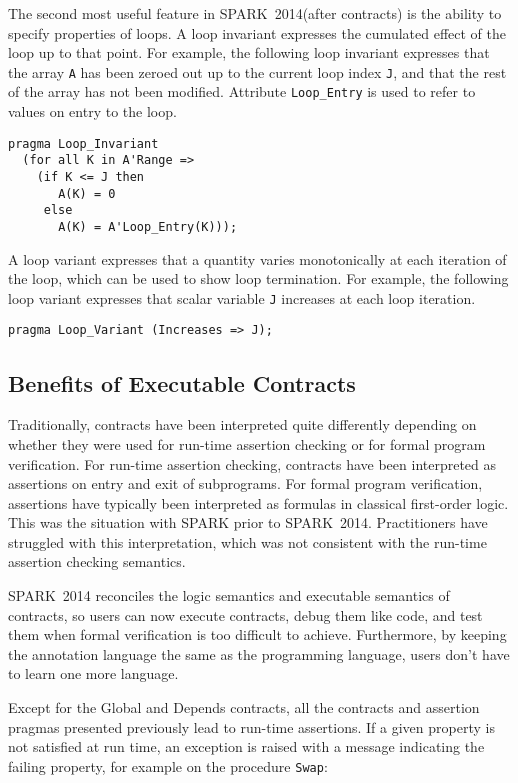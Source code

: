 \documentclass[10pt,a4paper,twocolumn]{article}
\newcommand{\newspark}{SPARK~2014\xspace}
\newcommand{\SPARK}[1]{\lstinline[language=Ada,basicstyle={\footnotesize
      \sffamily},framesep=0pt]$#1$}
\begin{document}
The second most useful feature in \newspark (after contracts) is the ability to
specify properties of loops. A loop invariant expresses the cumulated effect
of the loop up to that point. For example, the following loop invariant
expresses that the array \SPARK{A} has been zeroed out up to the current loop
index \SPARK{J}, and that the rest of the array has not been modified.
Attribute \SPARK{Loop_Entry} is used to refer to values on entry to the loop.

\begin{lstlisting}
pragma Loop_Invariant
  (for all K in A'Range =>
    (if K <= J then
       A(K) = 0
     else
       A(K) = A'Loop_Entry(K)));
\end{lstlisting}

A loop variant expresses that a quantity varies monotonically at each iteration
of the loop, which can be used to show loop termination. For example, the
following loop variant expresses that scalar variable \SPARK{J} increases at
each loop iteration.

\begin{lstlisting}
pragma Loop_Variant (Increases => J);
\end{lstlisting}

\subsection{Benefits of Executable Contracts}
\label{subsec:ExecutableContracts}

Traditionally, contracts have been interpreted quite differently depending on
whether they were used for run-time assertion checking or for formal program
verification. For run-time assertion checking, contracts have been interpreted
as assertions on entry and exit of subprograms. For formal program
verification, assertions have typically been interpreted as formulas in
classical first-order logic. This was the situation with SPARK prior to
\newspark. Practitioners have struggled with this interpretation, which was not
consistent with the run-time assertion checking semantics.\cite{tseChalin10}

\newspark reconciles the logic semantics and executable semantics of contracts,
so users can now execute contracts, debug them like code, and test them when
formal verification is too difficult to achieve. Furthermore, by keeping the
annotation language the same as the programming language, users don't have to
learn one more language.

Except for the Global and Depends contracts, all the contracts and assertion
pragmas presented previously lead to run-time assertions. If a given property
is not satisfied at run time, an exception is raised with a message indicating
the failing property, for example on the procedure \SPARK{Swap}:
\end{document}
